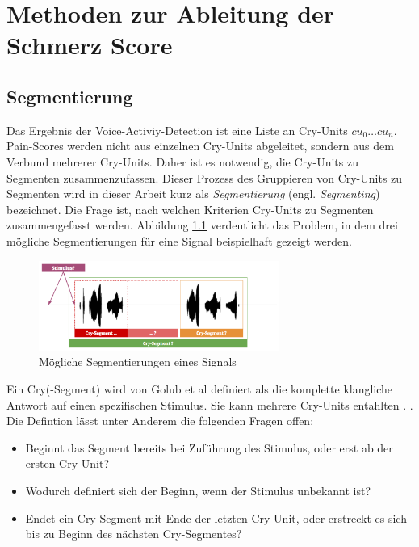 \chapter{Methoden zur Ableitung der Schmerz Score}

\section{Segmentierung}
\label{sec:segmenting}
Das Ergebnis der Voice-Activiy-Detection ist eine Liste an Cry-Units  $cu_0 \ldots cu_n$. Pain-Scores werden nicht aus einzelnen Cry-Units abgeleitet, sondern aus dem Verbund mehrerer Cry-Units. Daher ist es notwendig, die Cry-Units zu Segmenten zusammenzufassen. Dieser Prozess des Gruppieren von Cry-Units zu Segmenten wird in dieser Arbeit kurz als \emph{Segmentierung} (engl. \emph{Segmenting}) bezeichnet. Die Frage ist, nach welchen Kriterien Cry-Units zu Segmenten zusammengefasst werden. Abbildung \ref{img:segmenting02} verdeutlicht das Problem, in dem drei mögliche Segmentierungen für eine Signal beispielhaft gezeigt werden.

\begin{figure}[H]
	\centering
	\includegraphics[width=0.7\textwidth]{bilder/segmentierung07.png}
	\caption{Mögliche Segmentierungen eines Signals}
	\label{img:segmenting02}
\end{figure}

Ein Cry(-Segment) wird von Golub et al definiert als \glqq die komplette klangliche Antwort auf einen spezifischen Stimulus. Sie kann mehrere Cry-Units entahlten \grqq. \cite[S. 61, übersetzt aus dem Englischen]{cryModel}. Die Defintion lässt unter Anderem die folgenden Fragen offen:

\begin{itemize}[leftmargin=*]
	\item Beginnt das Segment bereits bei Zuführung des Stimulus, oder erst ab der ersten Cry-Unit? 
	\item Wodurch definiert sich der Beginn, wenn der Stimulus unbekannt ist?
	\item Endet ein Cry-Segment mit Ende der letzten \glqq Cry-Unit\grqq{}, oder erstreckt es sich bis zu Beginn des nächsten Cry-Segmentes?
\end{itemize}

